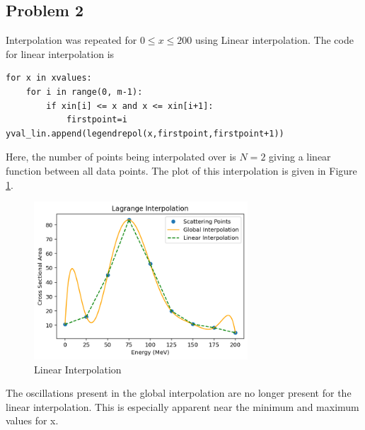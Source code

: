 \documentclass[aps,prb,groupedaddress,nofootinbib,floatfix]{revtex4}
\begin{document}
\subsection*{Problem 2} 
Interpolation was repeated for $0\le x\le 200$ using Linear interpolation. The code for linear interpolation is
\begin{lstlisting}
for x in xvalues:
    for i in range(0, m-1):
        if xin[i] <= x and x <= xin[i+1]:
            firstpoint=i
yval_lin.append(legendrepol(x,firstpoint,firstpoint+1))
\end{lstlisting}
Here, the number of points being interpolated over is $N=2$ giving a linear function between all data points. The plot of this interpolation is given in Figure \ref{fig:Plot2}.
\begin{figure}[h]
	\includegraphics[width=8cm]{Plot2.png}
	\caption{Linear Interpolation}
	\label{fig:Plot2}
\end{figure}
The oscillations present in the global interpolation are no longer present for the linear interpolation. This is especially apparent near the minimum and maximum values for x.
\end{document}
